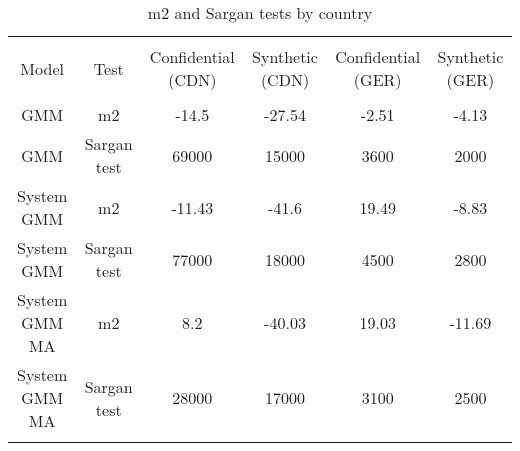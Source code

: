 
\begin{table}[!htbp] \centering 
  \caption{m2 and Sargan tests by country} 
  \label{tab:m2sargan} 
\begin{tabular}{@{\extracolsep{5pt}} cccccc} 
\\[-1.8ex]\hline 
\hline \\[-1.8ex] 
Model & Test & Confidential (CDN) & Synthetic (CDN) & Confidential (GER) & Synthetic (GER) \\ 
\hline \\[-1.8ex] 
GMM & m2 & -14.5 & -27.54 & -2.51 & -4.13 \\ 
GMM & Sargan test & 69000 & 15000 & 3600 & 2000 \\ 
System GMM & m2 & -11.43 & -41.6 & 19.49 & -8.83 \\ 
System GMM & Sargan test & 77000 & 18000 & 4500 & 2800 \\ 
System GMM MA & m2 & 8.2 & -40.03 & 19.03 & -11.69 \\ 
System GMM MA & Sargan test & 28000 & 17000 & 3100 & 2500 \\ 
\hline \\[-1.8ex] 
\end{tabular} 
\end{table} 
